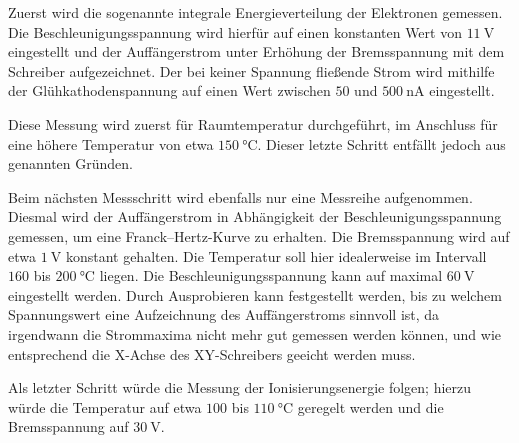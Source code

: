 Zuerst wird die sogenannte integrale Energieverteilung der Elektronen gemessen. Die Beschleunigungsspannung wird hierfür auf 
einen konstanten Wert von $\SI{11}{\volt}$ eingestellt und der Auffängerstrom unter Erhöhung der Bremsspannung mit 
dem Schreiber aufgezeichnet. 
Der bei keiner Spannung fließende Strom wird mithilfe der Glühkathodenspannung auf einen Wert zwischen $50$ und $\SI{500}{\nano\ampere}$
eingestellt. 

Diese Messung wird zuerst für Raumtemperatur durchgeführt, im Anschluss für eine höhere Temperatur von etwa $\SI{150}{\degreeCelsius}$. 
Dieser letzte Schritt entfällt jedoch aus genannten Gründen. 

Beim nächsten Messschritt wird ebenfalls nur eine Messreihe aufgenommen. 
Diesmal wird der Auffängerstrom in Abhängigkeit der Beschleunigungsspannung gemessen, um eine Franck--Hertz-Kurve zu erhalten. 
Die Bremsspannung wird auf etwa $\SI{1}{\volt}$ konstant gehalten. 
Die Temperatur soll hier idealerweise im Intervall $160$ bis $\SI{200}{\degreeCelsius}$ liegen. 
Die Beschleunigungsspannung kann auf maximal $\SI{60}{\volt}$ eingestellt werden. 
Durch Ausprobieren kann festgestellt werden, bis zu welchem Spannungswert eine Aufzeichnung des Auffängerstroms sinnvoll ist, 
da irgendwann die Strommaxima nicht mehr gut gemessen werden können, und wie entsprechend die X-Achse des XY-Schreibers 
geeicht werden muss. 

Als letzter Schritt würde die Messung der Ionisierungsenergie folgen; hierzu würde die Temperatur auf etwa $100$ bis $\SI{110}{\degreeCelsius}$ 
geregelt werden und die Bremsspannung auf $\SI{30}{\volt}$.